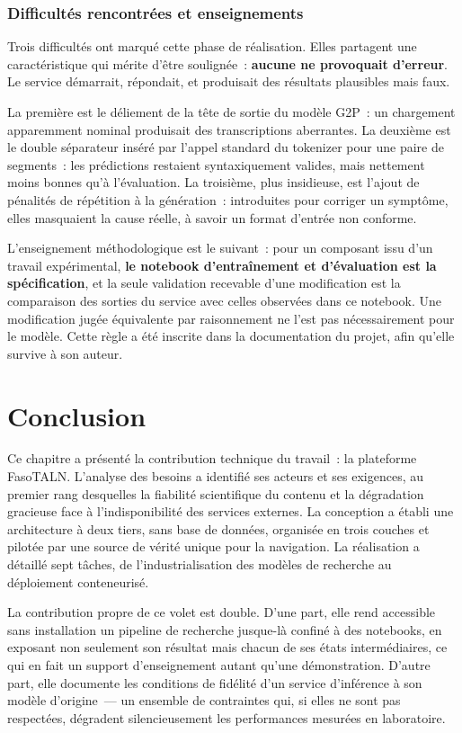 \subsubsection{Difficultés rencontrées et enseignements}

Trois difficultés ont marqué cette phase de réalisation. Elles partagent une
caractéristique qui mérite d'être soulignée~: \textbf{aucune ne provoquait d'erreur}.
Le service démarrait, répondait, et produisait des résultats plausibles mais faux.

La première est le déliement de la tête de sortie du modèle G2P~: un chargement
apparemment nominal produisait des transcriptions aberrantes. La deuxième est le
double séparateur inséré par l'appel standard du tokenizer pour une paire de
segments~: les prédictions restaient syntaxiquement valides, mais nettement moins
bonnes qu'à l'évaluation. La troisième, plus insidieuse, est l'ajout de pénalités de
répétition à la génération~: introduites pour corriger un symptôme, elles masquaient
la cause réelle, à savoir un format d'entrée non conforme.

L'enseignement méthodologique est le suivant~: pour un composant issu d'un travail
expérimental, \textbf{le notebook d'entraînement et d'évaluation est la spécification},
et la seule validation recevable d'une modification est la comparaison des sorties du
service avec celles observées dans ce notebook. Une modification jugée équivalente par
raisonnement ne l'est pas nécessairement pour le modèle. Cette règle a été inscrite
dans la documentation du projet, afin qu'elle survive à son auteur.

\section{Conclusion}

Ce chapitre a présenté la contribution technique du travail~: la plateforme FasoTALN.
L'analyse des besoins a identifié ses acteurs et ses exigences, au premier rang
desquelles la fiabilité scientifique du contenu et la dégradation gracieuse face à
l'indisponibilité des services externes. La conception a établi une architecture à
deux tiers, sans base de données, organisée en trois couches et pilotée par une source
de vérité unique pour la navigation. La réalisation a détaillé sept tâches, de
l'industrialisation des modèles de recherche au déploiement conteneurisé.

La contribution propre de ce volet est double. D'une part, elle rend accessible sans
installation un pipeline de recherche jusque-là confiné à des notebooks, en exposant
non seulement son résultat mais chacun de ses états intermédiaires, ce qui en fait un
support d'enseignement autant qu'une démonstration. D'autre part, elle documente les
conditions de fidélité d'un service d'inférence à son modèle d'origine~--- un ensemble
de contraintes qui, si elles ne sont pas respectées, dégradent silencieusement les
performances mesurées en laboratoire.
